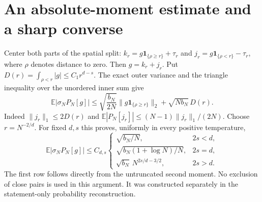 \documentclass[11pt]{article}
\newcommand{\E}{\mathbb E}
\begin{document}
\section{An absolute-moment estimate and a sharp converse}
Center both parts of the spatial split: $k_r=g\mathbf1_{\{\rho\ge r\}}+
\tau_r$ and $j_r=g\mathbf1_{\{\rho<r\}}-\tau_r$, where $\rho$ denotes
distance to zero. Then $g=k_r+j_r$. Put
$D(r)=\int_{\rho<r}|g|\le C_1r^{d-s}$. The exact outer variance and the
triangle inequality over the unordered inner sum give
\[
 \E|\sigma_NP_N[g]|
 \le \sqrt{\frac{b_N}{2N}}\|g\mathbf1_{\{\rho\ge r\}}\|_2
       +\sqrt{Nb_N}\,D(r).
\]
Indeed $\|j_r\|_1\le2D(r)$ and
$\E|P_N[j_r]|\le (N-1)\|j_r\|_1/(2N)$. Choose $r=N^{-2/d}$.
For fixed $d,s$ this proves, uniformly in every positive temperature,
\begin{equation}\label{L1rates}
 \E|\sigma_NP_N[g]|\le C_{d,s}
 \begin{cases}
  \sqrt{b_N/N},&2s<d,\\
  \sqrt{b_N(1+\log N)/N},&2s=d,\\
  \sqrt{b_N}\,N^{2s/d-3/2},&2s>d.
 \end{cases}
\end{equation}
The first row follows directly from the untruncated second moment.
No exclusion of close pairs is used in this argument. It was constructed
separately in the statement-only probability reconstruction.
\end{document}

